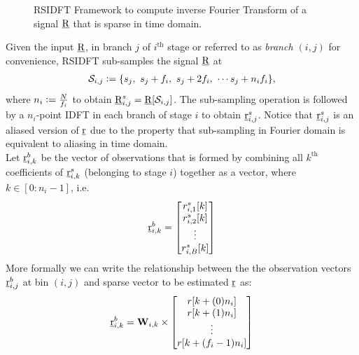 \begin{enumerate}
	 \begin{figure}[h!]
	 	\begin{center}
	 	\resizebox{0.6\textwidth}{!}{}
	 	\end{center}	   
	 	\caption{ RSIDFT Framework to compute inverse Fourier Transform of a signal $\underline{\mathrm{R}}$ that is sparse in time domain. }\label{fig:rsidft}
	\vspace{5 pt}
	 \end{figure}
	 	
	 Given the input $\underline{\mathrm{R}}$, in branch $j$ of $i^{\text{th}}$ stage or referred to as \textit{branch $(i,j)$} for convenience, RSIDFT sub-samples the signal $\underline{\mathrm{R}}$ at
\begin{align}
\label{Eqn:SamplingSets}
	 \mathcal{S}_{i,j} \mathrel{\mathop:}= \{s_j,\ s_j + f_i,\ s_j + 2f_i,\ \cdots s_j + n_i f_i\},
\end{align}
where $n_i\mathrel{\mathop:}= \frac{N}{f_i}$ to obtain $\underline{\mathrm{R}}^{s}_{i,j}=\underline{\mathrm{R}}[\mathcal{S}_{i,j}]$. The sub-sampling operation is followed by a $n_i$-point IDFT in each branch of stage $i$ to obtain $ \underline{\mathrm{r}}^{s}_{i,j}$. Notice that $ \underline{\mathrm{r}}^{s}_{i,j}$ is an aliased version of $\underline{\mathrm{r}}$ due to the property that sub-sampling in Fourier domain is equivalent to aliasing in time domain.\\

	 Let $\underline{\mathrm{r}}^{b}_{i,k}$ be the  vector of observations that is formed by combining all $k^{\text{th}}$ coefficients of $\underline{\mathrm{r}}^{s}_{i,k}$ (belonging to stage $i$) together as a vector, where $k\in [0:n_i-1]$, i.e.
\[
	  \underline{\mathrm{r}}^{b}_{i,k} = \begin{bmatrix}
	 r^{s}_{i,1}[k] \\
	 r^{s}_{i,2}[k] \\
	 \vdots\\
	 r^{s}_{i,B}[k]
	 \end{bmatrix}  
\]
More formally we can write the relationship between the the observation vectors $\underline{\mathrm{r}}^b_{i,j}$ at bin $(i,j)$ and sparse vector to be estimated $\underline{\mathrm{r}}$ as:
\begin{align}
	\label{Eqn:Generator Equation}
	\underline{\mathrm{r}}^b_{i,k}= \mathbf{W}_{i,k} \times
	\begin{bmatrix}
		r[k+(0)n_i] \\
		r[k+(1)n_i] \\
		\vdots\\
		r[k+(f_i-1)n_i]
	\end{bmatrix}
\end{align}


\end{enumerate}
